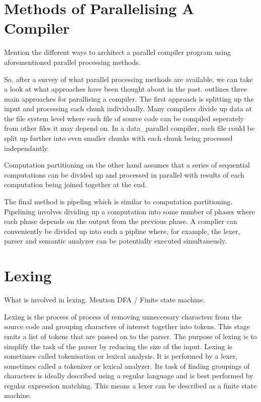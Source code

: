 \section{Methods of Parallelising A Compiler} \label{compiler_parallel_methods}
\begin{sectionplan}
    Mention the different ways to architect a parallel compiler program using
aforementioned parallel processing methods.
\cite{hillis_data_1986, gross_parallel_1989, jena_design_2018, baer_model_1977}
\end{sectionplan}

So, after a survey of what parallel processing methods are available, we
can take a look at what approaches have been thought about in the past.
\cite{gross_parallel_1989} outlines three main approaches for parallising a
compiler. The first approach is splitting up the input and processing each chunk
individually. Many compilers divide up data at the file system level where each
file of source code can be compiled seperately from other files it may depend
on. In a \gls{data_parallel} compiler, each file could be split up further into
even smaller chunks with each chunk being processed independantly.

Computation partitioning on the other hand assumes that a series of sequential
computations can be divided up and processed in parallel with results of
each computation being joined together at the end. 

The final method is pipeling which is similar to computation partitioning.
Pipelining involves dividing up a computation into some number of phases
where each phase depends on the output from the previous phase. A complier can
conveniently be divided up into such a pipline where, for example, the lexer,
parser and semantic analyzer can be potentially executed simultaneusly. 

\section{Lexing}
\begin{sectionplan}
    What is involved in lexing. Mention DFA / Finite state machine.
	\cite{pai_t_systematic_2020, barve_parallel_2014, barve_parallel_2012, barve_improved_2015}
\end{sectionplan}

Lexing is the process of process of removing unneccesary characters from the
source code and grouping characters of interest together into tokens. This
stage emits a list of tokens that are passed on to the parser. The purpose of
lexing is to simplify the task of the parser by reducing the size of the input.
Lexing is sometimes  called tokenisation or lexical analysis. It is performed
by a lexer, sometimes called a tokenizer or lexical analyzer. Its task of
finding groupings of characters is ideally described using a regular language
and is best performed by regular expression matching. This means a lexer can be
described as a finite state machine.


